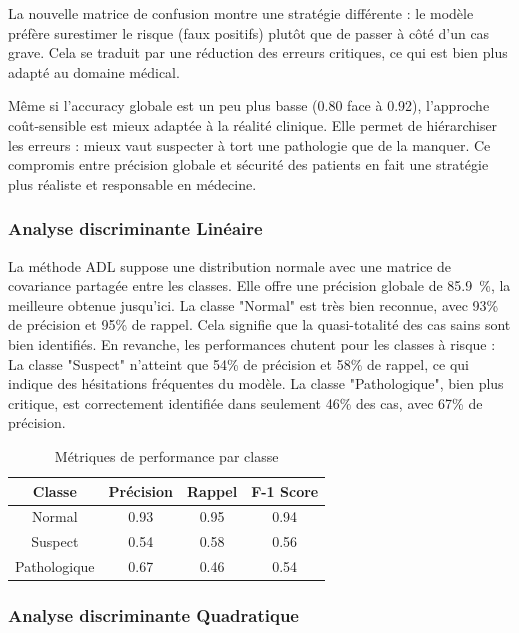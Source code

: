 \documentclass[twocolumn,10pt]{article}
\begin{document}
La nouvelle matrice de confusion montre une stratégie différente : le modèle préfère surestimer le risque (faux positifs) plutôt que de passer à côté d’un cas grave. Cela se traduit par une réduction des erreurs critiques, ce qui est bien plus adapté au domaine médical.

Même si l’accuracy globale est un peu plus basse (0.80 face à 0.92), l’approche coût-sensible est mieux adaptée à la réalité clinique. Elle permet de hiérarchiser les erreurs : mieux vaut suspecter à tort une pathologie que de la manquer. Ce compromis entre précision globale et sécurité des patients en fait une stratégie plus réaliste et responsable en médecine.

\subsubsection{Analyse discriminante Linéaire}\label{subsubsec:sup:ad:adl}

La méthode ADL suppose une distribution normale avec une matrice de covariance partagée entre les classes. Elle offre une précision globale de 85.9~\%, la meilleure obtenue jusqu’ici. La classe "Normal" est très bien reconnue, avec 93\% de précision et 95\% de rappel. Cela signifie que la quasi-totalité des cas sains sont bien identifiés.
En revanche, les performances chutent pour les classes à risque :
La classe "Suspect" n’atteint que 54\% de précision et 58\% de rappel, ce qui indique des hésitations fréquentes du modèle.
La classe "Pathologique", bien plus critique, est correctement identifiée dans seulement 46\% des cas, avec 67\% de précision.


\begin{table}[htbp]
\begin{center}
\caption{\label{tab:perf}Métriques de performance par classe}
\begin{tabular}{cccc}
\toprule
Classe & Précision & Rappel & F-1 Score \\
\midrule
Normal & 0.93 & 0.95 & 0.94 \\
Suspect & 0.54 & 0.58 & 0.56 \\
Pathologique & 0.67 & 0.46 & 0.54 \\
\bottomrule
\end{tabular}
\end{center}
\end{table}

\subsubsection{Analyse discriminante Quadratique}\label{subsubsec:sup:ad:adq}
\end{document}
